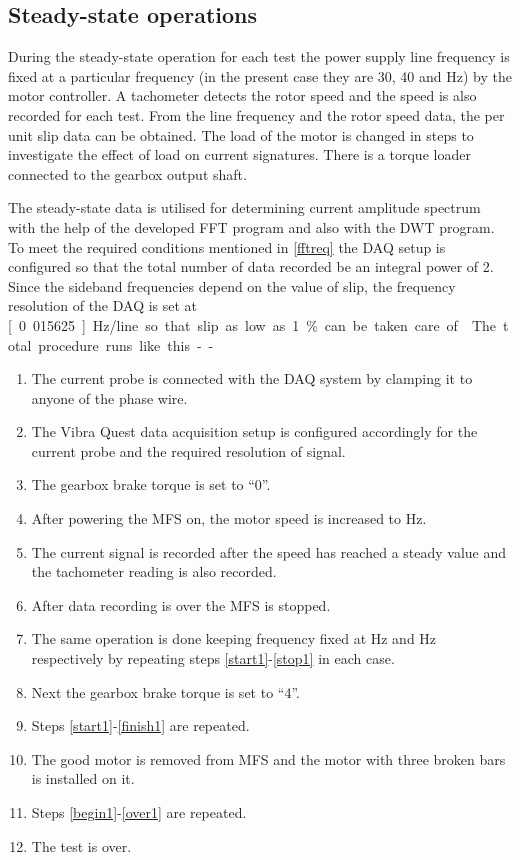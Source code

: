 \documentclass[a4paper,11pt]{report}
\begin{document}
\subsection{Steady-state operations} \label{sso}

During the steady-state operation for each test the power supply line frequency is fixed at a particular frequency (in the present case they are 30, 40 and \unit[50]{Hz}) by the motor controller. A tachometer detects the rotor speed and the speed is also recorded for each test. From the line frequency and the rotor speed data, the per unit slip data can be obtained. The load of the motor is changed in steps to investigate the effect of load on current signatures. There is a torque loader connected to the gearbox output shaft. 

The steady-state data is utilised for determining current amplitude spectrum with the help of the developed FFT program and also with the DWT program. To meet the required conditions mentioned in \ref{fftreq} the DAQ setup is configured so that the total number of data recorded be an integral power of 2. Since the sideband frequencies depend on the value of slip, the frequency resolution of the DAQ is set at \unit[0.015625]{Hz/line} so that slip as low as 1\% can be taken care of \cite{t32pg145}. 

The total procedure runs like this --

\begin{enumerate}
\item The current probe is connected with the DAQ system by clamping it to anyone of the phase wire.
\item The Vibra Quest data acquisition setup is configured accordingly for the current probe and the required resolution of signal.
\item The gearbox brake torque is set to ``0''. \label{begin1}
\item After powering the MFS on, the motor speed is increased to \unit[30]{Hz}. \label{start1}
\item The current signal is recorded after the speed has reached a steady value and the tachometer reading is also recorded.
\item After data recording is over the MFS is stopped. \label{stop1}
\item The same operation is done keeping frequency fixed at \unit[40]{Hz} and \unit[50]{Hz} respectively by repeating steps \ref{start1}-\ref{stop1} in each case. \label{finish1}
\item Next the gearbox brake torque is set to ``4''.
\item Steps \ref{start1}-\ref{finish1} are repeated. \label{over1}
\item The good motor is removed from MFS and the motor with three broken bars is installed on it.
\item Steps \ref{begin1}-\ref{over1} are repeated.
\item The test is over.
\end{enumerate}
\end{document}
